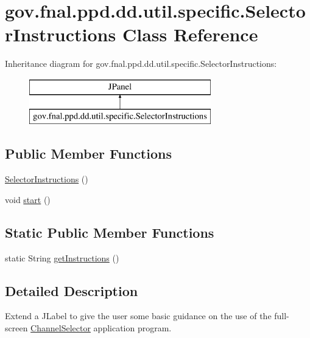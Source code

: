\hypertarget{classgov_1_1fnal_1_1ppd_1_1dd_1_1util_1_1specific_1_1SelectorInstructions}{\section{gov.\-fnal.\-ppd.\-dd.\-util.\-specific.\-Selector\-Instructions Class Reference}
\label{classgov_1_1fnal_1_1ppd_1_1dd_1_1util_1_1specific_1_1SelectorInstructions}
}
Inheritance diagram for gov.\-fnal.\-ppd.\-dd.\-util.\-specific.\-Selector\-Instructions\-:\begin{figure}[H]
\begin{center}
\leavevmode
\includegraphics[height=2.000000cm]{classgov_1_1fnal_1_1ppd_1_1dd_1_1util_1_1specific_1_1SelectorInstructions}
\end{center}
\end{figure}
\subsection*{Public Member Functions}
\begin{DoxyCompactItemize}
\item 
\hyperlink{classgov_1_1fnal_1_1ppd_1_1dd_1_1util_1_1specific_1_1SelectorInstructions_a47e9f61f9d6edf54d0ac63288fe53a2b}{Selector\-Instructions} ()
\item 
void \hyperlink{classgov_1_1fnal_1_1ppd_1_1dd_1_1util_1_1specific_1_1SelectorInstructions_acc5173794b299a9e4f9062cead781bad}{start} ()
\end{DoxyCompactItemize}
\subsection*{Static Public Member Functions}
\begin{DoxyCompactItemize}
\item 
static String \hyperlink{classgov_1_1fnal_1_1ppd_1_1dd_1_1util_1_1specific_1_1SelectorInstructions_a512c9d611cefc2c1053d9af36ec59213}{get\-Instructions} ()
\end{DoxyCompactItemize}


\subsection{Detailed Description}
Extend a J\-Label to give the user some basic guidance on the use of the full-\/screen \hyperlink{classgov_1_1fnal_1_1ppd_1_1dd_1_1ChannelSelector}{Channel\-Selector} application program.

